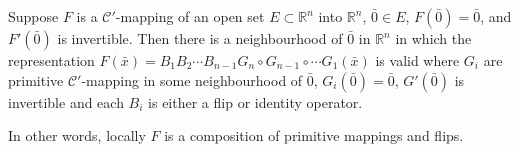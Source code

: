 \begin{theorem}
	Suppose $F$ is a $\mathscr{C}'$-mapping of an open set $E \subset \mathbb{R}^n$ into $\mathbb{R}^n$, $\bar{0} \in E$, $F(\bar{0}) = \bar{0}$, and $F'(\bar{0})$ is invertible.
	Then there is a neighbourhood of $\bar{0}$ in $\mathbb{R}^n$ in which the representation $F(\bar{x}) = B_1B_2\cdots B_{n-1}G_n\circ G_{n-1}\circ \cdots G_1(\bar{x})$ is valid where $G_i$ are primitive $\mathscr{C}'$-mapping in some neighbourhood of $\bar{0}$, $G_i(\bar{0}) = \bar{0}$, $G'(\bar{0})$ is invertible and each $B_i$ is either a flip or identity operator.

\begin{commentary}
	In other words, locally $F$ is a composition of primitive mappings and flips.
\end{commentary}
\end{theorem}
